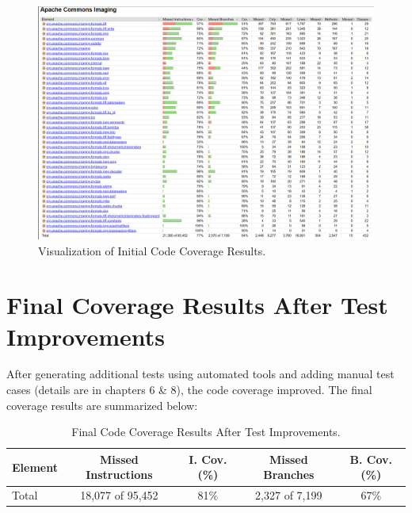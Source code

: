 \documentclass[a4paper,12pt]{report}
\begin{document}
\begin{figure}[H]
    \centering
    \includegraphics[width=1\textwidth]{Report_Img/init_cov.png}
    \caption{Visualization of Initial Code Coverage Results.}
    \label{fig:initial_coverage_visualization}
\end{figure}
\newpage
\section{Final Coverage Results After Test Improvements}
After generating additional tests using automated tools and adding manual test cases (details are in chapters 6 \& 8), the code coverage improved. The final coverage results are summarized below:

\begin{table}[H]
    \centering
    \begin{tabular}{|l|c|c|c|c|}
        \hline
        \textbf{Element} & \textbf{Missed Instructions} & \textbf{I. Cov. (\%)} & \textbf{Missed Branches} & \textbf{B. Cov. (\%)} \\ \hline
        Total & 18,077 of 95,452 & 81\% & 2,327 of 7,199 & 67\% \\ \hline
    \end{tabular}
    \caption{Final Code Coverage Results After Test Improvements.}
    \label{tab:final_coverage}
\end{table}
\end{document}
